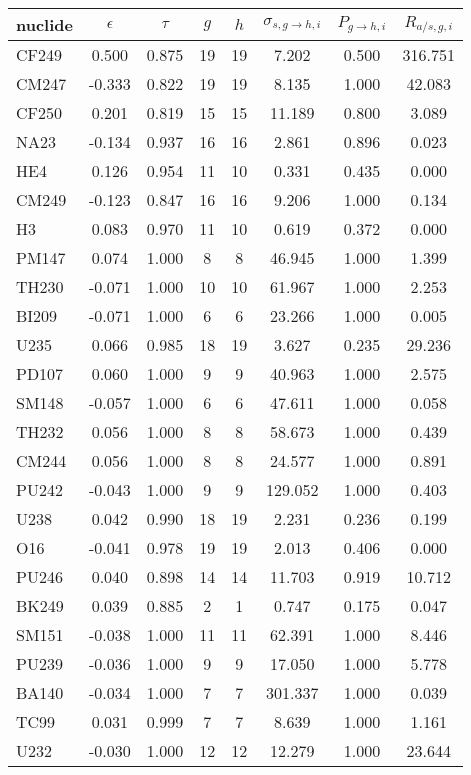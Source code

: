 \begin{tabular}{|l|ccccccc|}
\hline
nuclide & $\epsilon$ & $\tau$ & $g$ & $h$ & $\sigma_{s,g\to h,i}$ & $P_{g\to h,i}$ & $R_{a/s,g,i}$\\
\hline
CF249 & 0.500 & 0.875 & 19 & 19 & 7.202 & 0.500 & 316.751\\
CM247 & -0.333 & 0.822 & 19 & 19 & 8.135 & 1.000 & 42.083\\
CF250 & 0.201 & 0.819 & 15 & 15 & 11.189 & 0.800 & 3.089\\
NA23 & -0.134 & 0.937 & 16 & 16 & 2.861 & 0.896 & 0.023\\
HE4 & 0.126 & 0.954 & 11 & 10 & 0.331 & 0.435 & 0.000\\
CM249 & -0.123 & 0.847 & 16 & 16 & 9.206 & 1.000 & 0.134\\
H3 & 0.083 & 0.970 & 11 & 10 & 0.619 & 0.372 & 0.000\\
PM147 & 0.074 & 1.000 & 8 & 8 & 46.945 & 1.000 & 1.399\\
TH230 & -0.071 & 1.000 & 10 & 10 & 61.967 & 1.000 & 2.253\\
BI209 & -0.071 & 1.000 & 6 & 6 & 23.266 & 1.000 & 0.005\\
U235 & 0.066 & 0.985 & 18 & 19 & 3.627 & 0.235 & 29.236\\
PD107 & 0.060 & 1.000 & 9 & 9 & 40.963 & 1.000 & 2.575\\
SM148 & -0.057 & 1.000 & 6 & 6 & 47.611 & 1.000 & 0.058\\
TH232 & 0.056 & 1.000 & 8 & 8 & 58.673 & 1.000 & 0.439\\
CM244 & 0.056 & 1.000 & 8 & 8 & 24.577 & 1.000 & 0.891\\
PU242 & -0.043 & 1.000 & 9 & 9 & 129.052 & 1.000 & 0.403\\
U238 & 0.042 & 0.990 & 18 & 19 & 2.231 & 0.236 & 0.199\\
O16 & -0.041 & 0.978 & 19 & 19 & 2.013 & 0.406 & 0.000\\
PU246 & 0.040 & 0.898 & 14 & 14 & 11.703 & 0.919 & 10.712\\
BK249 & 0.039 & 0.885 & 2 & 1 & 0.747 & 0.175 & 0.047\\
SM151 & -0.038 & 1.000 & 11 & 11 & 62.391 & 1.000 & 8.446\\
PU239 & -0.036 & 1.000 & 9 & 9 & 17.050 & 1.000 & 5.778\\
BA140 & -0.034 & 1.000 & 7 & 7 & 301.337 & 1.000 & 0.039\\
TC99 & 0.031 & 0.999 & 7 & 7 & 8.639 & 1.000 & 1.161\\
U232 & -0.030 & 1.000 & 12 & 12 & 12.279 & 1.000 & 23.644\\

\end{tabular}
